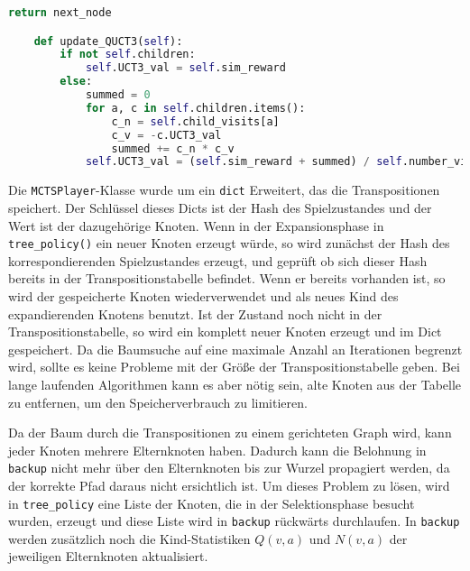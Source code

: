 \begin{lstlisting}[language=Python,label={lst:transpos-node}]
        return next_node

    def update_QUCT3(self):
        if not self.children:
            self.UCT3_val = self.sim_reward
        else:
            summed = 0
            for a, c in self.children.items():
                c_n = self.child_visits[a]
                c_v = -c.UCT3_val
                summed += c_n * c_v
            self.UCT3_val = (self.sim_reward + summed) / self.number_visits

\end{lstlisting}

Die \verb|MCTSPlayer|-Klasse wurde um ein \verb|dict| Erweitert, das die Transpositionen speichert.
Der Schlüssel dieses Dicts ist der Hash des Spielzustandes und der Wert ist der dazugehörige Knoten.
Wenn in der Expansionsphase in \verb|tree_policy()| ein neuer Knoten erzeugt würde, so wird zunächst der Hash des korrespondierenden Spielzustandes erzeugt, und geprüft ob sich dieser Hash bereits in der Transpositionstabelle befindet.
Wenn er bereits vorhanden ist, so wird der gespeicherte Knoten wiederverwendet und als neues Kind des expandierenden Knotens benutzt.
Ist der Zustand noch nicht in der Transpositionstabelle, so wird ein komplett neuer Knoten erzeugt und im Dict gespeichert.
Da die Baumsuche auf eine maximale Anzahl an Iterationen begrenzt wird, sollte es keine Probleme mit der Größe der Transpositionstabelle geben.
Bei lange laufenden Algorithmen kann es aber nötig sein, alte Knoten aus der Tabelle zu entfernen, um den Speicherverbrauch zu limitieren.

Da der Baum durch die Transpositionen zu einem gerichteten Graph wird, kann jeder Knoten mehrere Elternknoten haben.
Dadurch kann die Belohnung in \verb|backup| nicht mehr über den Elternknoten bis zur Wurzel propagiert werden, da der korrekte Pfad daraus nicht ersichtlich ist.
Um dieses Problem zu lösen, wird in \verb|tree_policy| eine Liste der Knoten, die in der Selektionsphase besucht wurden, erzeugt und diese Liste wird in \verb|backup| rückwärts durchlaufen.
In \verb|backup| werden zusätzlich noch die Kind-Statistiken $Q(v,a)$ und $N(v,a)$ der jeweiligen Elternknoten aktualisiert.

